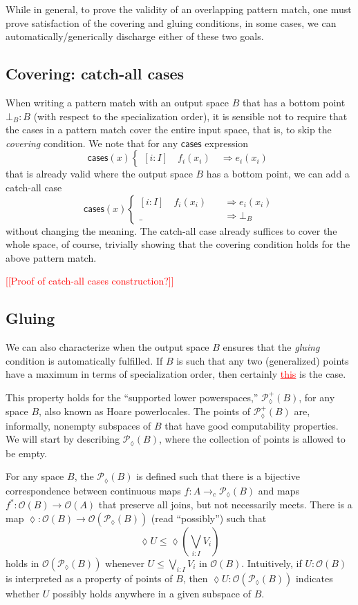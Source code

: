 \documentclass[conference]{IEEEtran}
\newcommand{\PLower}{\mathcal{P}_\lozenge}
\newcommand{\cto}{\to_c}
\newcommand{\Open}[1]{\mathcal{O}({#1})}
\newcommand{\wildcard}{\_}
\newcommand{\Branch}{\Rightarrow}
\newcommand{\iimg}[1]{{#1}^*}
\newcommand{\note}[1]{\textcolor{red}{[[{#1}]]}}
\newcommand{\grammar}[1]{\textcolor{red}{\underline{#1}}}
\begin{document}
While in general, to prove the validity of an overlapping pattern match, one must prove satisfaction of the covering and gluing conditions, in some cases, we can automatically/generically discharge either of these two goals. 

\subsection{Covering: catch-all cases}

When writing a pattern match with an output space $B$ that has a bottom point $\bot_B : B$ (with respect to the specialization order), it is sensible not to require that the cases in a pattern match cover the entire input space, that is, to skip the \emph{covering} condition. We note that for any $\mathsf{cases}$ expression
\[
\mathsf{cases}(x)
\begin{cases}
[i : I] \quad f_i(x_i) \quad \Branch e_i(x_i)
\end{cases}
\]
that is already valid where the output space $B$ has a bottom point, we can add a catch-all case
\[
\mathsf{cases}(x)
\begin{cases}
[i : I] \quad f_i(x_i) \quad &\Branch e_i(x_i)
\\ \wildcard \quad &\Branch \bot_B
\end{cases}
\]
without changing the meaning. The catch-all case already suffices to cover the whole space, of course, trivially showing that the covering condition holds for the above pattern match.

\note{Proof of catch-all cases construction?}

\subsection{Gluing}

We can also characterize when the output space $B$ ensures that the \emph{gluing} condition is automatically fulfilled. If $B$ is such that any two (generalized) points have a maximum in terms of specialization order, then certainly \grammar{this} is the case.

This property holds for the ``supported lower powerspaces,'' $\PLower^+(B)$, for any space $B$, also known as Hoare powerlocales. The points of $\PLower^+(B)$ are, informally, nonempty subspaces of $B$ that have good computability properties. We will start by describing $\PLower(B)$, where the collection of points is allowed to be empty.

For any space $B$, the $\PLower(B)$ is defined such that there is a bijective correspondence between continuous maps $f : A \cto \PLower(B)$ and maps $\iimg{f} : \Open{B} \to \Open{A}$ that preserve all joins, but not necessarily meets. There is a map $\lozenge : \Open{B} \to \Open{\PLower(B)}$ (read ``possibly'') such that
\[
\lozenge U \le \lozenge \left( \bigvee_{i : I} V_i \right)
\]
holds in $\Open{\PLower(B)}$ whenever $U \le \bigvee_{i : I} V_i$ in $\Open{B}$. Intuitively, if $U : \Open{B}$ is interpreted as a property of points of $B$, then $\lozenge U : \Open{\PLower(B)}$ indicates whether $U$ possibly holds anywhere in a given subspace of $B$.
\end{document}
